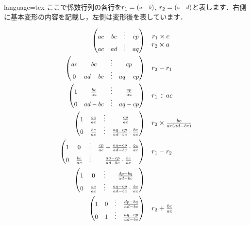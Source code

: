 \documentclass[../main]{subfiles}
\begin{document}
\begin{Code}{language=tex}
ここで係数行列の各行を$r_1 = {\scriptsize\begin{pmatrix}a&b\end{pmatrix}}$, $r_2 = {\scriptsize\begin{pmatrix}c&d\end{pmatrix}}$と表します．右側に基本変形の内容を記載し，左側は変形後を表しています．

\begin{align*}
    \PMat{ac&bc&\vdots&cp\\ac&ad&\vdots&aq} &
    \quad \begin{matrix}
        r_1\times c\\r_2\times a
    \end{matrix} \\
    \PMat{ac&bc&\vdots&cp\\0&ad-bc&\vdots&aq-cp} &
    \quad \begin{matrix}
        r_2-r_1
    \end{matrix} \\
    \PMat{1&\frac{bc}{ac}&\vdots&\frac{cp}{ac}\\0&ad-bc&\vdots&aq-cp} &
    \quad \begin{matrix}
        r_1\div ac
    \end{matrix} \\
    \PMat{1&\frac{bc}{ac}&\vdots&\frac{cp}{ac}\\0&\frac{bc}{ac}&\vdots&\frac{aq-cp}{ad-bc}\cdot\frac{bc}{ac}} &
    \quad \begin{matrix}
        r_2\times \frac{bc}{ac(ad-bc)}
    \end{matrix} \\
    \PMat{1&0&\vdots&\frac{cp}{ac}-\frac{aq-cp}{ad-bc}\cdot\frac{bc}{ac}\\0&\frac{bc}{ac}&\vdots&\frac{aq-cp}{ad-bc}\cdot\frac{bc}{ac}} &
    \quad \begin{matrix}
        r_1-r_2
    \end{matrix} \\
    \PMat{1&0&\vdots&\frac{dp-bq}{ad-bc}\\0&\frac{bc}{ac}&\vdots&\frac{aq-cp}{ad-bc}\cdot\frac{bc}{ac}} &
    \quad \begin{matrix}
    \end{matrix} \\
    \PMat{1&0&\vdots&\frac{dp-bq}{ad-bc}\\0&1&\vdots&\frac{aq-cp}{ad-bc}} &
    \quad \begin{matrix}
        r_2\div \frac{bc}{ac}
    \end{matrix}
\end{align*}
\end{Code}
\end{document}
